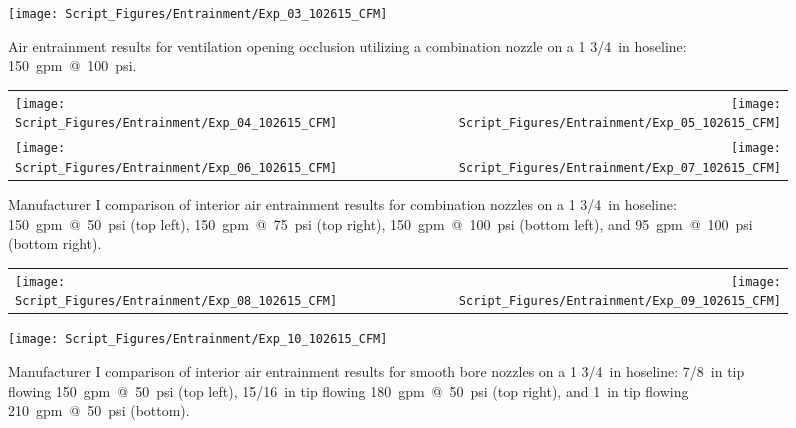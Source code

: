 \documentclass[12pt,oneside]{book}
\begin{document}
\begin{figure}[!ht]
\centering
\texttt{[image: Script\_Figures/Entrainment/Exp\_03\_102615\_CFM]}
\caption[Air Entrainment Results Varying Ventilation Opening Occlusion]{Air entrainment results for ventilation opening occlusion utilizing a combination nozzle on a 1 3/4~in hoseline: 150~gpm~@~100~psi.}
\label{fig:Opening_Occlusion}
\end{figure}

\clearpage

\begin{figure}[!ht]
\begin{tabular*}{\textwidth}{lr}
\texttt{[image: Script\_Figures/Entrainment/Exp\_04\_102615\_CFM]} &
\texttt{[image: Script\_Figures/Entrainment/Exp\_05\_102615\_CFM]} \\
\texttt{[image: Script\_Figures/Entrainment/Exp\_06\_102615\_CFM]} &
\texttt{[image: Script\_Figures/Entrainment/Exp\_07\_102615\_CFM]} \\
\end{tabular*}
\caption[Manufacturer I Air Entrainment from Combination Nozzle Varying Pressure and Flowrate]{Manufacturer I comparison of interior air entrainment results for combination nozzles on a 1 3/4~in hoseline: 150~gpm~@~50~psi (top left), 150~gpm~@~75~psi (top right), 150~gpm~@~100~psi (bottom left), and 95~gpm~@~100~psi (bottom right).}
\label{fig:1_5_Interior_Combination_Manufacturer_I}
\end{figure}

\clearpage

\begin{figure}[!ht]
\begin{tabular*}{\textwidth}{lr}
\texttt{[image: Script\_Figures/Entrainment/Exp\_08\_102615\_CFM]} &
\texttt{[image: Script\_Figures/Entrainment/Exp\_09\_102615\_CFM]} \\
\end{tabular*}
\centering
\texttt{[image: Script\_Figures/Entrainment/Exp\_10\_102615\_CFM]} 
\caption[Manufacturer I Air Entrainment from Smooth Bore Nozzle Varying Pressure and Flowrate]{Manufacturer I comparison of interior air entrainment results for smooth bore nozzles on a 1 3/4~in hoseline: 7/8~in tip flowing 150~gpm~@~50~psi (top left), 15/16~in tip flowing 180~gpm~@~50~psi (top right), and 1~in tip flowing 210~gpm~@~50~psi (bottom).}
\label{fig:1_5_Interior_Smooth_Bore_Manufacturer_I}
\end{figure}

\clearpage
\end{document}
